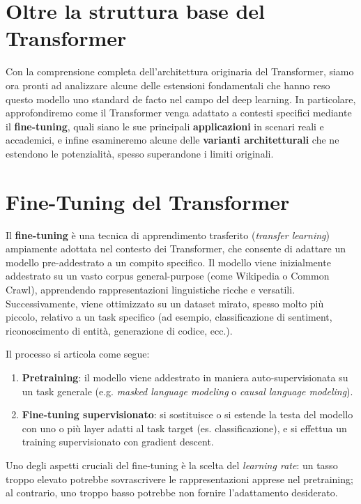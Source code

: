\section{Oltre la struttura base del Transformer}

Con la comprensione completa dell'architettura originaria del Transformer, siamo ora pronti ad analizzare alcune delle estensioni fondamentali che hanno reso questo modello uno standard de facto nel campo del deep learning. In particolare, approfondiremo come il Transformer venga adattato a contesti specifici mediante il \textbf{fine-tuning}, quali siano le sue principali \textbf{applicazioni} in scenari reali e accademici, e infine esamineremo alcune delle \textbf{varianti architetturali} che ne estendono le potenzialità, spesso superandone i limiti originali.

\section{Fine-Tuning del Transformer}

Il \textbf{fine-tuning} è una tecnica di apprendimento trasferito (\textit{transfer learning}) ampiamente adottata nel contesto dei Transformer, che consente di adattare un modello pre-addestrato a un compito specifico. Il modello viene inizialmente addestrato su un vasto corpus general-purpose (come Wikipedia o Common Crawl), apprendendo rappresentazioni linguistiche ricche e versatili. Successivamente, viene ottimizzato su un dataset mirato, spesso molto più piccolo, relativo a un task specifico (ad esempio, classificazione di sentiment, riconoscimento di entità, generazione di codice, ecc.).

Il processo si articola come segue:
    \begin{enumerate}
        \item \textbf{Pretraining}: il modello viene addestrato in maniera auto-supervisionata su un task generale (e.g. \textit{masked language modeling} o \textit{causal language modeling}).
        \item \textbf{Fine-tuning supervisionato}: si sostituisce o si estende la testa del modello con uno o più layer adatti al task target (es. classificazione), e si effettua un training supervisionato con gradient descent.
    \end{enumerate}

Uno degli aspetti cruciali del fine-tuning è la scelta del \textit{learning rate}: un tasso troppo elevato potrebbe sovrascrivere le rappresentazioni apprese nel pretraining; al contrario, uno troppo basso potrebbe non fornire l'adattamento desiderato.

